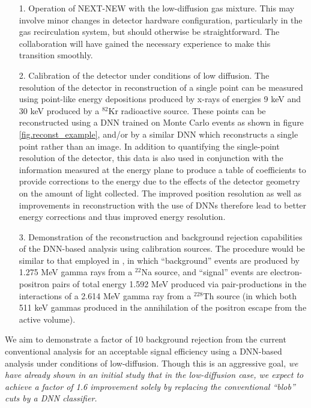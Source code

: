 \documentclass[11pt,a4paper]{article}
\begin{document}
\begin{enumerate}
	\item[1.] Operation of NEXT-NEW with the low-diffusion gas mixture. This may involve minor changes in detector hardware configuration, particularly in the gas recirculation system, but should otherwise be straightforward. The collaboration will have gained the necessary experience to make this transition smoothly.
	\item[2.] Calibration of the detector under conditions of low diffusion. The resolution of the detector in reconstruction of a single point can be measured using point-like energy depositions produced by x-rays of energies 9 keV and 30 keV produced by a $^{82}$Kr radioactive source. These points can be reconstructed using a DNN trained on Monte Carlo events as shown in figure \ref{fig.reconst_example}, and/or by a similar DNN which reconstructs a single point rather than an image. In addition to quantifying the single-point resolution of the detector, this data is also used in conjunction with the information measured at the energy plane to produce a table of coefficients to provide corrections to the energy due to the effects of the detector geometry on the amount of light collected. The improved position resolution as well as improvements in reconstruction with the use of DNNs therefore lead to better energy corrections and thus improved energy resolution.
	\item[3.] Demonstration of the reconstruction and background rejection capabilities of the DNN-based analysis using calibration sources. The procedure would be similar to that employed in \cite{NEXT_topology}, in which ``background'' events are produced by 1.275 MeV gamma rays from a $^{22}$Na source, and ``signal'' events are electron-positron pairs of total energy 1.592 MeV produced via pair-productions in the interactions of a 2.614 MeV gamma ray from a $^{228}$Th source (in which both 511 keV gammas produced in the annihilation of the positron escape from the active volume).
\end{enumerate}

We aim to demonstrate a factor of 10 background rejection from the current conventional analysis for an acceptable signal efficiency using a DNN-based analysis under conditions of low-diffusion. Though this is an aggressive goal, \emph{we have already shown in an initial study that in the low-diffusion case, we expect to achieve a factor of 1.6 improvement solely by replacing the conventional ``blob'' cuts by a DNN classifier.}\\
\end{document}
